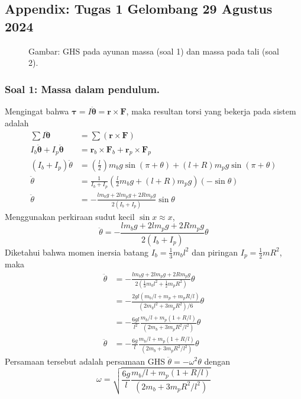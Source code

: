 \documentclass[../main.tex]{subfiles}
\begin{document}
\subsection*{Appendix: Tugas 1 Gelombang 29 Agustus 2024}

\begin{figure}[b]
    \centering
    
    
    \caption*{Gambar: GHS pada ayunan massa (soal 1) dan massa pada tali (soal 2).}
  \end{figure}
  \subsubsection*{Soal 1: Massa dalam pendulum.} Mengingat bahwa $  \boldsymbol{\tau} =I\boldsymbol{\ddot{\theta}} = \mathbf{r}\times \mathbf{F}$, maka resultan torsi yang bekerja pada sistem adalah
  \begin{align*}
    \sum I\boldsymbol{\ddot{\theta}}&=\sum( \mathbf{r}\times \mathbf{F})\\
    I_b\boldsymbol{\ddot{\theta}}+I_p\boldsymbol{\ddot{\theta}}&=\mathbf{r}_b\times \mathbf{F}_b+\mathbf{r}_p\times \mathbf{F}_p\\
    (I_b+I_p)\ddot{\theta}&=(\frac{l}{2})m_bg\sin(\pi+\theta)+(l+R)m_pg\sin(\pi+\theta)\\
    \ddot{\theta}&=\frac{1}{I_b+I_p}(\frac{l}{2}m_bg+ (l+R)m_pg) (-\sin\theta)\\
    \ddot{\theta}&=-\frac{lm_bg+2lm_pg+2Rm_pg}{2(I_b+I_p)}\sin\theta
  \end{align*}
  Menggunakan perkiraan sudut kecil $\sin x\approx x$,
  \begin{equation*}
    \ddot{\theta}=-\frac{lm_bg+2lm_pg+2Rm_pg}{2(I_b+I_p)}\theta
  \end{equation*}
  Diketahui bahwa momen inersia batang $I_b=\frac{1}{3}m_bl^2$ dan piringan $I_p=\frac{1}{2}mR^2$, maka
  \begin{align*}
    \ddot{\theta}&=-\frac{lm_bg+2lm_pg+2Rm_pg}{2(\frac{1}{3}m_bl^2+\frac{1}{2}m_pR^2)}\theta\\
    &=-\frac{2gl(m_b/l+m_p+m_pR/l)}{(2m_bl^2+3m_pR^2)/6}\theta\\
    &=-\frac{6gl}{l^2}\frac{m_b/l+m_p(1+R/l)}{(2m_b+3m_pR^2/l^2)}\theta\\
    \ddot{\theta}&=-\frac{6g}{l}\frac{m_b/l+m_p(1+R/l)}{(2m_b+3m_pR^2/l^2)}\theta
  \end{align*}
  Persamaan tersebut adalah persamaan GHS $\ddot{\theta}=-\omega^2\theta$ dengan
  \begin{equation*}
    \omega=\sqrt{\frac{6g}{l}\frac{m_b/l+m_p(1+R/l)}{(2m_b+3m_pR^2/l^2)}}
  \end{equation*}
  
\end{document}
